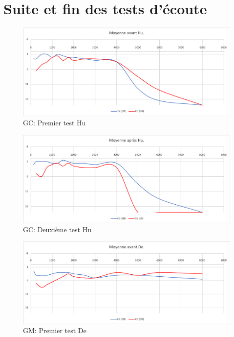 %
%
%
%
%
 \section{Suite et fin des tests d'écoute}

 \begin{figure}[th]
	\centering
	\includegraphics[width=0.7\linewidth]{images/graphiques/moyavHU}
	\caption[GC: Patient Hu : 1° test]{GC: Premier test Hu}
	\label{fig:moyavhu}
\end{figure}



\begin{figure}[th]
	\centering
	\includegraphics[width=0.7\linewidth]{images/graphiques/moyaprHU}
	\caption[GC: Patient Hu : 2° test]{GC: Deuxième test Hu}
	\label{fig:moyaprhu}
\end{figure}
\begin{figure}[th]
	\centering
	\includegraphics[width=0.7\linewidth]{images/graphiques/moyavDE.png}
	\caption[GM: Patient De : 1° test]{GM: Premier test De}
	\label{fig:moyavde}
\end{figure}


